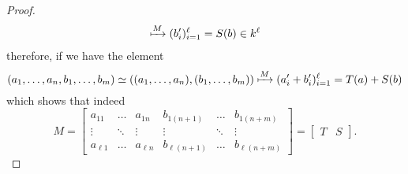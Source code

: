 \begin{proof}
\begin{gather*}
        \xmapsto{M} (b'_i)_{i=1}^\ell = S(b) \in k^\ell
    \end{gather*}
    therefore, if we have the element
    \[
        (a_1, \dots, a_n, b_1, \dots, b_m) \simeq \left( (a_1, \dots, a_n), (b_1,
        \dots, b_m) \right) \xmapsto M (a'_i + b'_i)_{i=1}^\ell = T(a) + S(b)
    \]
    which shows that indeed
    \[
        M =
        \begin{bmatrix}
            a_{11}     & \dots  & a_{1n}     & b_{1(n+1)}     & \dots  & b_{1(n+m)}    \\
            \vdots     & \ddots & \vdots     & \vdots         & \ddots & \vdots        \\
            a_{\ell 1} & \dots  & a_{\ell n} & b_{\ell (n+1)} & \dots  & b_{\ell(n+m)}
        \end{bmatrix}
        =
        \begin{bmatrix}
            T & S
        \end{bmatrix}
        .
    \]
\end{proof}
